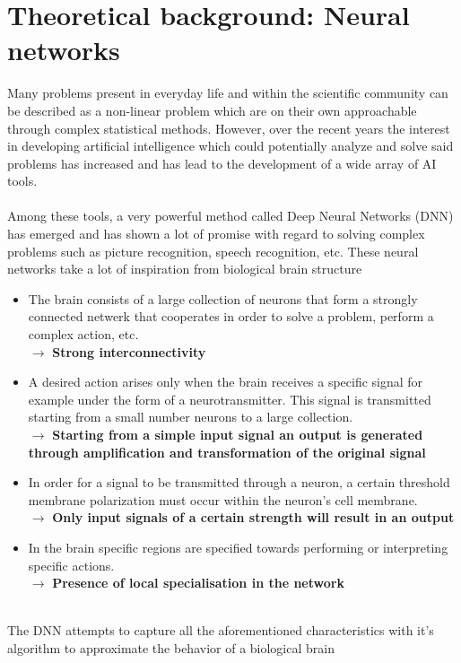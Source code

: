 \documentclass[]{article}
\begin{document}
\newpage
\section{Theoretical background: Neural networks}
Many problems present in everyday life and within the scientific community can be described as a non-linear problem which are on their own approachable through complex statistical methods. However, over the recent years the interest in developing artificial intelligence which could potentially analyze and solve said problems has increased and has lead to the development of a wide array of AI tools.
\\
\\
Among these tools, a very powerful method called Deep Neural Networks (DNN) has emerged and has shown a lot of promise with regard to solving complex problems such as picture recognition, speech recognition, etc. These neural networks take a lot of inspiration from biological brain structure
\\
\begin{itemize}
	\item The brain consists of a large collection of neurons that form a strongly connected netwerk that cooperates in order to solve a problem, perform a complex action, etc.\\$\rightarrow$ \textbf{Strong interconnectivity}
	\item A desired action arises only when the brain receives a specific signal for example under the form of a neurotransmitter. This signal is transmitted starting from a small number neurons to a large collection. \\$\rightarrow$ \textbf{Starting from a simple input signal an output is generated through amplification and transformation of the original signal}
	\item In order for a signal to be transmitted through a neuron, a certain threshold membrane polarization must occur within the neuron's cell membrane. \\$\rightarrow$ \textbf{Only input signals of a certain strength will result in an output} 
	\item In the brain specific regions are specified towards performing or interpreting specific actions. \\$\rightarrow$ \textbf{Presence of local specialisation in the network} 
\end{itemize}
\\
The DNN attempts to capture all the aforementioned characteristics with it's algorithm to approximate the behavior of a biological brain 
   
\end{document}
